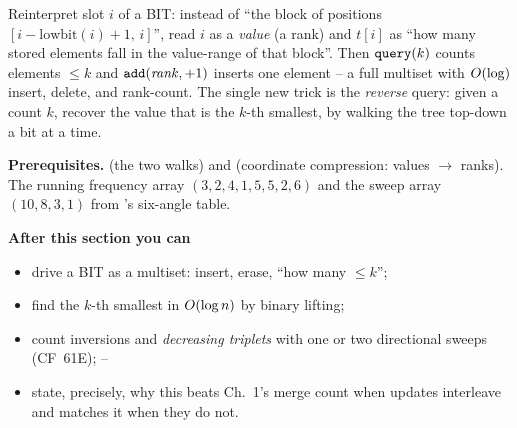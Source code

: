 \begin{topicintro}
Reinterpret slot \(i\) of a BIT: instead of ``the block of positions
\([i{-}\text{lowbit}(i){+}1,\,i]\)'', read \(i\) as a \emph{value} (a rank)
and \(t[i]\) as ``how many stored elements fall in the value-range of that
block''.  Then \(\texttt{query}(k)\) counts elements \(\le k\) and
\(\texttt{add}(\mathit{rank},+1)\) inserts one element -- a full multiset with
\(O(\log)\) insert, delete, and rank-count.  The single new trick is the
\emph{reverse} query: given a count \(k\), recover the value that is the
\(k\)-th smallest, by walking the tree top-down a bit at a time.

\textbf{Prerequisites.}  (the two walks) and
 (coordinate compression: values \(\to\) ranks).  The
running frequency array \((3,2,4,1,5,5,2,6)\) and the sweep array
\((10,8,3,1)\) from 's six-angle table.

\textbf{After this section you can}
\begin{itemize}[nosep]
  \item drive a BIT as a multiset: insert, erase, ``how many \(\le k\)''; \hfill{}
  \item find the \(k\)-th smallest in \(O(\log n)\) by binary lifting; \hfill{}
  \item count inversions and \emph{decreasing triplets} with one or two
        directional sweeps (CF~61E); \hfill{}--
  \item state, precisely, why this beats Ch.~1's merge count when updates
        interleave and matches it when they do not. \hfill{}
\end{itemize}
\end{topicintro}

